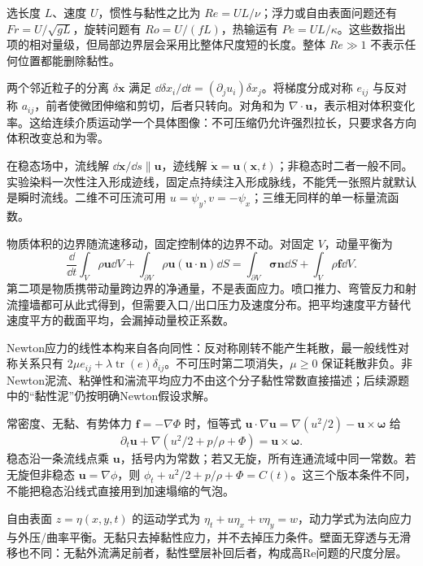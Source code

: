 选长度 $L$、速度 $U$，惯性与黏性之比为 $Re=UL/\nu$；浮力或自由表面问题还有 $Fr=U/\sqrt{gL}$，旋转问题有 $Ro=U/(fL)$，热输运有 $Pe=UL/\kappa$。这些数指出项的相对量级，但局部边界层会采用比整体尺度短的长度。整体 $Re\gg1$ 不表示任何位置都能删除黏性。

两个邻近粒子的分离 $\delta\mathbf x$ 满足 $\dd\delta x_i/\dd t=(\partial_j u_i)\delta x_j$。将梯度分成对称 $e_{ij}$ 与反对称 $a_{ij}$，前者使微团伸缩和剪切，后者只转向。对角和为 $\nabla\cdot\mathbf u$，表示相对体积变化率。这给连续介质运动学一个具体图像：不可压缩仍允许强烈拉长，只要求各方向体积改变总和为零。

在稳态场中，流线解 $\dd\mathbf x/\dd s\parallel\mathbf u$，迹线解 $\dot{\mathbf x}=\mathbf u(\mathbf x,t)$；非稳态时二者一般不同。实验染料一次性注入形成迹线，固定点持续注入形成脉线，不能凭一张照片就默认是瞬时流线。二维不可压流可用 $u=\psi_y,v=-\psi_x$；三维无同样的单一标量流函数。

物质体积的边界随流速移动，固定控制体的边界不动。对固定 $V$，动量平衡为
\[
\frac{\dd}{\dd t}\int_V\rho\mathbf u\dd V
+\int_{\partial V}\rho\mathbf u(\mathbf u\cdot\mathbf n)\dd S
=\int_{\partial V}\boldsymbol\sigma\mathbf n\dd S+\int_V\rho\mathbf f\dd V.
\]
第二项是物质携带动量跨边界的净通量，不是表面应力。喷口推力、弯管反力和射流撞墙都可从此式得到，但需要入口/出口压力及速度分布。把平均速度平方替代速度平方的截面平均，会漏掉动量校正系数。

Newton应力的线性本构来自各向同性：反对称刚转不能产生耗散，最一般线性对称关系只有 $2\mu e_{ij}+\lambda\operatorname{tr}(e)\delta_{ij}$。不可压时第二项消失，$\mu\ge0$ 保证耗散非负。非Newton泥流、粘弹性和湍流平均应力不由这个分子黏性常数直接描述；后续源题中的“黏性泥”仍按明确Newton假设求解。

常密度、无黏、有势体力 $\mathbf f=-\nabla\Phi$ 时，恒等式 $\mathbf u\cdot\nabla\mathbf u=\nabla(u^2/2)-\mathbf u\times\boldsymbol\omega$ 给
\[
\partial_t\mathbf u+\nabla(u^2/2+p/\rho+\Phi)=\mathbf u\times\boldsymbol\omega.
\]
稳态沿一条流线点乘 $\mathbf u$，括号内为常数；若又无旋，所有连通流域中同一常数。若无旋但非稳态 $\mathbf u=\nabla\phi$，则 $\phi_t+u^2/2+p/\rho+\Phi=C(t)$。这三个版本条件不同，不能把稳态沿线式直接用到加速塌缩的气泡。

自由表面 $z=\eta(x,y,t)$ 的运动学式为 $\eta_t+u\eta_x+v\eta_y=w$，动力学式为法向应力与外压/曲率平衡。无黏只去掉黏性应力，并不去掉压力条件。壁面无穿透与无滑移也不同：无黏外流满足前者，黏性壁层补回后者，构成高Re问题的尺度分层。

